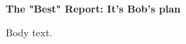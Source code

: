 \documentclass[
]{article}
\author{A. O'Brien}
\date{}
\begin{document}
\begin{center}

\end{center}

\vspace{2em}

\begin{center}
\Large\textbf{The "Best" Report: It's Bob's plan}
\end{center}

\vspace{8em}
\newpage

Body text.
\end{document}
